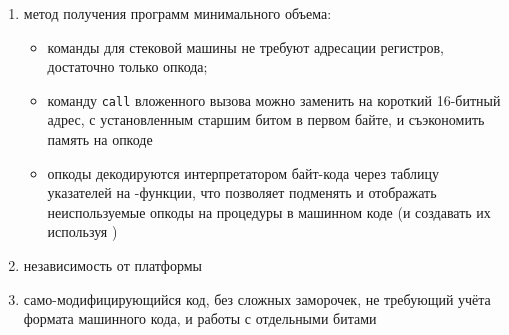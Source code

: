 \clearpage
{}\label{bc}\secdown

\begin{enumerate}
\item метод получения программ минимального объема:
\begin{itemize}[nosep]
    \item команды для стековой машины не требуют адресации регистров, достаточно только
    опкода;
    \item команду \verb|call| вложенного вызова можно заменить на короткий 16-битный адрес, с установленным старшим
    битом в первом байте, и съэкономить память на опкоде
    \item опкоды декодируются интерпретатором байт-кода через таблицу указателей
    на \ci-функции, что позволяет подменять и отображать неиспользуемые опкоды
    на процедуры в машинном
    коде (и создавать их используя )
\end{itemize}
\item независимость от платформы
\item само-модифицирующийся код, без сложных заморочек, не требующий учёта
формата машинного кода, и работы с отдельными битами
\end{enumerate}

\secup
